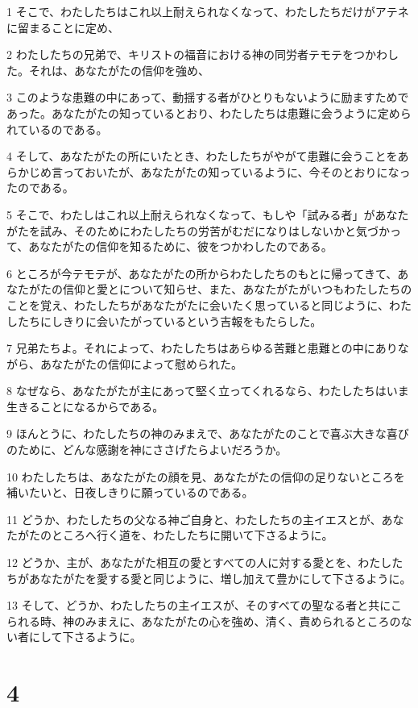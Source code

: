 \par 1 そこで、わたしたちはこれ以上耐えられなくなって、わたしたちだけがアテネに留まることに定め、
\par 2 わたしたちの兄弟で、キリストの福音における神の同労者テモテをつかわした。それは、あなたがたの信仰を強め、
\par 3 このような患難の中にあって、動揺する者がひとりもないように励ますためであった。あなたがたの知っているとおり、わたしたちは患難に会うように定められているのである。
\par 4 そして、あなたがたの所にいたとき、わたしたちがやがて患難に会うことをあらかじめ言っておいたが、あなたがたの知っているように、今そのとおりになったのである。
\par 5 そこで、わたしはこれ以上耐えられなくなって、もしや「試みる者」があなたがたを試み、そのためにわたしたちの労苦がむだになりはしないかと気づかって、あなたがたの信仰を知るために、彼をつかわしたのである。
\par 6 ところが今テモテが、あなたがたの所からわたしたちのもとに帰ってきて、あなたがたの信仰と愛とについて知らせ、また、あなたがたがいつもわたしたちのことを覚え、わたしたちがあなたがたに会いたく思っていると同じように、わたしたちにしきりに会いたがっているという吉報をもたらした。
\par 7 兄弟たちよ。それによって、わたしたちはあらゆる苦難と患難との中にありながら、あなたがたの信仰によって慰められた。
\par 8 なぜなら、あなたがたが主にあって堅く立ってくれるなら、わたしたちはいま生きることになるからである。
\par 9 ほんとうに、わたしたちの神のみまえで、あなたがたのことで喜ぶ大きな喜びのために、どんな感謝を神にささげたらよいだろうか。
\par 10 わたしたちは、あなたがたの顔を見、あなたがたの信仰の足りないところを補いたいと、日夜しきりに願っているのである。
\par 11 どうか、わたしたちの父なる神ご自身と、わたしたちの主イエスとが、あなたがたのところへ行く道を、わたしたちに開いて下さるように。
\par 12 どうか、主が、あなたがた相互の愛とすべての人に対する愛とを、わたしたちがあなたがたを愛する愛と同じように、増し加えて豊かにして下さるように。
\par 13 そして、どうか、わたしたちの主イエスが、そのすべての聖なる者と共にこられる時、神のみまえに、あなたがたの心を強め、清く、責められるところのない者にして下さるように。

\chapter{4}

